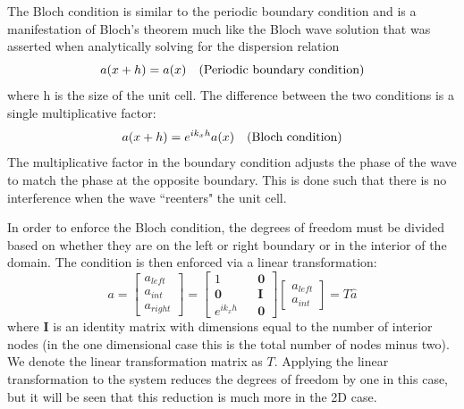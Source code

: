 \documentclass{article}
\begin{document}
The Bloch condition is similar to the periodic boundary condition and is a 
manifestation of Bloch's theorem much like the Bloch wave solution that was 
asserted when analytically solving for the dispersion relation
\begin{equation}
a(x+h) = a(x)\quad\textnormal{(Periodic boundary condition)}
\end{equation}
where h is the size of the unit cell. The difference between the two conditions 
is a single multiplicative factor:
\begin{equation}
a(x+h) = e^{ik_xh}a(x)\quad\textnormal{(Bloch condition)}
\end{equation}
The multiplicative factor in the boundary condition adjusts the phase of the 
wave to match the phase at the opposite boundary. This is done such that there 
is no interference when the wave ``reenters" the unit cell.

In order to enforce the Bloch condition, the degrees of freedom must be divided 
based on whether they are on the left or right boundary or in the interior of 
the domain. The condition is then enforced via a linear transformation: 
\begin{equation}
a =
\begin{bmatrix}
a_{left} \\
a_{int} \\
a_{right}
\end{bmatrix}
= 
\begin{bmatrix}
1 && \mathbf{0} \\
\mathbf{0} && \mathbf{I}\\
e^{ik_xh} && \mathbf{0}
\end{bmatrix}
\begin{bmatrix}
a_{left} \\
a_{int}
\end{bmatrix}
= T \hat{a}
\end{equation}
where $\mathbf{I}$ is an identity matrix with dimensions equal to the number of 
interior nodes (in the one dimensional case this is the total number of nodes 
minus two). We denote the linear transformation matrix as $T$.
Applying the linear transformation to the system reduces the degrees of freedom 
by one in this case, but it will be seen that this reduction is much more in 
the 2D case.
\end{document}
